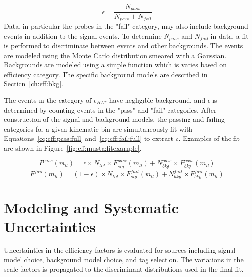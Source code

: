 \begin{equation}
\epsilon = \frac{N_{pass}}{N_{pass}+N_{fail}}
\label{eq:eff:eq}
\end{equation}
Data, in particular the probes in the "fail" category, may also include background events in addition to the \zll signal events. To determine $N_{pass}$ and $N_{fail}$ in data, a fit is performed to discriminate between \zll events and other backgrounds. The \zll events are modeled using the Monte Carlo distribution smeared with a Gaussian. Backgrounds are modeled using a simple function which is varies based on efficiency category. The specific background models are described in Section~\ref{ch:eff:bkg}.


The events in the category of $\epsilon_{HLT}$ have negligible background, and $\epsilon$ is determined by counting events in the "pass" and "fail" categories.
After construction of the signal and background models, the passing and failing categories for a given kinematic bin are simultaneously fit with Equations~\ref{eq:eff:pass:full} and~\ref{eq:eff:fail:full} to extract $\epsilon$. Examples of the fit are shown in Figure~\ref{fig:eff:musta:fitexample}.

\begin{equation}
F^{pass}\left(m_{ll}\right)=\epsilon \times N_{tot} \times F_{sig}^{pass}\left(m_{ll} \right) + N^{pass}_{bkg} \times F_{bkg}^{pass} \left(m_{ll} \right)
\label{eq:eff:pass:full}
\end{equation}
\begin{equation}
F^{fail}\left(m_{ll}\right)=\left(1-\epsilon\right) \times N_{tot} \times F_{sig}^{fail}\left(m_{ll} \right) + N^{fail}_{bkg} \times F_{bkg}^{fail} \left(m_{ll} \right)
\label{eq:eff:fail:full}
\end{equation}





\section{Modeling and Systematic Uncertainties}\label{ch:eff:systematics}
Uncertainties in the efficiency factors is evaluated for sources including signal model choice, background model choice, and tag selection. The variations in the scale factors is propagated to the discriminant distributions used in the final fit.
